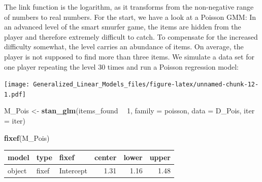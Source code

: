 \documentclass[]{svmono}
\newenvironment{Shaded}{\begin{snugshade}}{\end{snugshade}}
\newcommand{\KeywordTok}[1]{\textcolor[rgb]{0.13,0.29,0.53}{\textbf{#1}}}
\newcommand{\DataTypeTok}[1]{\textcolor[rgb]{0.13,0.29,0.53}{#1}}
\newcommand{\DecValTok}[1]{\textcolor[rgb]{0.00,0.00,0.81}{#1}}
\newcommand{\FloatTok}[1]{\textcolor[rgb]{0.00,0.00,0.81}{#1}}
\newcommand{\StringTok}[1]{\textcolor[rgb]{0.31,0.60,0.02}{#1}}
\newcommand{\OperatorTok}[1]{\textcolor[rgb]{0.81,0.36,0.00}{\textbf{#1}}}
\newcommand{\NormalTok}[1]{#1}
\theoremstyle{definition}
\theoremstyle{definition}
\theoremstyle{definition}
\theoremstyle{remark}
\begin{document}
The link function is the logarithm, as it transforms from the
non-negative range of numbers to real numbers. For the start, we have a
look at a Poisson GMM: In an advanced level of the smart smurfer game,
the items are hidden from the player and therefore extremely difficult
to catch. To compensate for the increased difficulty somewhat, the level
carries an abundance of items. On average, the player is not supposed to
find more than three items. We simulate a data set for one player
repeating the level 30 times and run a Poisson regression model:

\begin{Shaded}
\end{Shaded}

\texttt{[image: Generalized\_Linear\_Models\_files/figure-latex/unnamed-chunk-12-1.pdf]}

\begin{Shaded}
\begin{Highlighting}[]
\NormalTok{M_Pois <-}\StringTok{ }
\StringTok{  }\KeywordTok{stan_glm}\NormalTok{(items_found }\OperatorTok{~}\StringTok{ }\DecValTok{1}\NormalTok{,}
           \DataTypeTok{family =}\NormalTok{ poisson,}
           \DataTypeTok{data =}\NormalTok{ D_Pois, }\DataTypeTok{iter =}\NormalTok{ iter)}
\end{Highlighting}
\end{Shaded}

\begin{Shaded}
\begin{Highlighting}[]
\KeywordTok{fixef}\NormalTok{(M_Pois)}
\end{Highlighting}
\end{Shaded}

\begin{longtable}[]{@{}lllrrr@{}}
\toprule
model & type & fixef & center & lower & upper\tabularnewline
\midrule
\endhead
object & fixef & Intercept & 1.31 & 1.16 & 1.48\tabularnewline
\bottomrule
\end{longtable}
\end{document}
